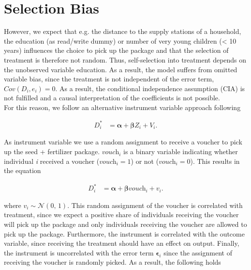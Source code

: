 \section{Selection Bias} \label{sec:selection}

However, we expect that e.g. the distance to the supply stations of a household, the education (as read/write dummy) or number of very young children (< 10 years) influences the choice to pick up the package and that the selection of treatment is therefore not random. Thus, self-selection into treatment depends on the unobserved variable education. As a result, the model suffers from omitted variable bias, since the treatment is not independent of the error term, $Cov(\textit{D}_i, \textit{e}_i) = 0$. As a result, the conditional independence assumption (CIA) is not fulfilled and a causal interpretation of the coefficients is not possible.\\ 

For this reason, we follow an alternative instrument variable approach following 

\begin{align}
	\label{eq:eq8}
	\textit{D}_i^\ast &= \boldsymbol{\alpha} + \boldsymbol{\beta} \textit{Z}_i + \textit{V}_i.
\end{align}

As instrument variable we use a random assignment to receive a voucher to pick up the seed + fertilizer package. $\textit{vouch}_i$ is a binary variable indicating whether individual \textit{i} received a voucher ($\textit{vouch}_i = 1$) or not ($\textit{vouch}_i = 0$). This results in the equation

\begin{align}
	\label{eq:eq9}
	\textit{D}_i^\ast &= \boldsymbol{\alpha} + \boldsymbol{\beta} \textit{vouch}_i + \textit{v}_i.
\end{align}

where $\textit{v}_i \sim \mathcal{N}(0,\,1)$. This random assignment of the voucher is correlated with treatment, since we expect a positive share of individuals receiving the voucher will pick up the package and only individuals receiving the voucher are allowed to pick up the package. Furthermore, the instrument is correlated with the outcome variable, since receiving the treatment should have an effect on output. Finally, the instrument is uncorrelated with the error term $\boldsymbol{\epsilon}_i$ since the assignment of receiving the voucher is randomly picked. As a result, the following holds

